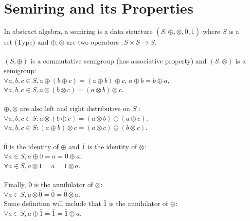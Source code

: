 \documentclass[a4paper,12pt,twoside,openright]{report}
\begin{document}
\section{Semiring and its Properties}
In abstract algebra, a semiring is a data structure $(S,\oplus,\otimes,\bar0,\bar1)$ where $S$ is a set (Type) and $\oplus,\otimes$ are two operators $:S\times S \rightarrow S$.\\\\
$(S,\oplus)$ is a commutative semigroup (has associative property) and $(S,\otimes)$ is a semigroup:\\ 
$\forall a,b,c \in S, a \oplus (b\oplus c) = (a \oplus b) \oplus c$, $a \oplus b = b \oplus a$,\\
$\forall a,b,c \in S, a \otimes (b\otimes c) = (a \otimes b) \otimes c$.\\\\ 
$\oplus,\otimes$ are also left and right distributive on $S$ : \\
$\forall a,b,c \in S: a \otimes(b \oplus c) = (a \otimes b) \oplus (a \otimes c)$, \\ 
$\forall a,b,c \in S:(a \oplus b) \otimes c  = (a \otimes c) \oplus (b \otimes c)$. \\\\
$\bar0$ is the identity of $\oplus$ and  $\bar1$ is the identity of $\otimes$: \\
$\forall a \in S, a \oplus \bar{0} = a = \bar{0} \oplus a$,\\
$\forall a \in S, a \otimes \bar{1} = a = \bar{1} \otimes a$. \\\\
Finally, $\bar0$ is the  annihilator of $\otimes$: \\
$\forall a \in S, a \otimes \bar{0} = \bar{0} = \bar{0} \otimes a$.\\
Some definition will include that $\bar1$ is the annihilator of $\oplus$: \\
$\forall a \in S, a \oplus \bar{1} = \bar{1} = \bar{1} \oplus a$.
\end{document}
